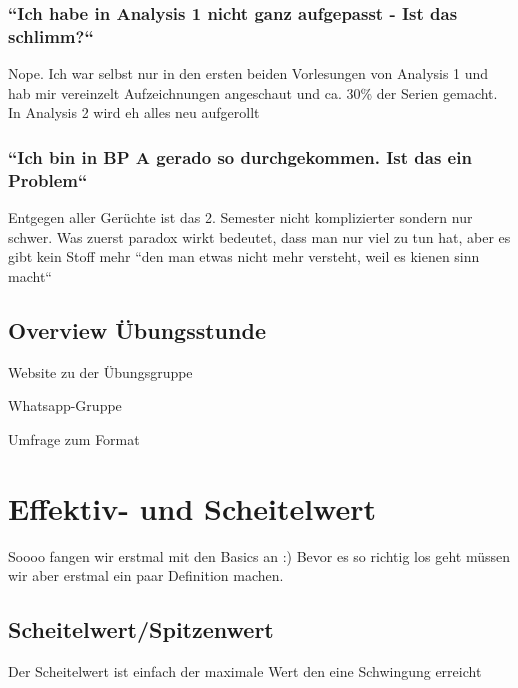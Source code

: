 \documentclass[11pt,a4paper]{article}
\begin{document}
\subsubsection{``Ich habe in Analysis 1 nicht ganz aufgepasst - Ist das schlimm{?}``}
Nope. Ich war selbst nur in den ersten beiden Vorlesungen von Analysis 1 und hab mir vereinzelt Aufzeichnungen angeschaut und ca. 30\% der Serien gemacht. In Analysis 2 wird eh alles neu aufgerollt

\subsubsection{``Ich bin in BP A gerado so durchgekommen. Ist das ein Problem``}
Entgegen aller Gerüchte ist das 2. Semester nicht komplizierter sondern nur schwer. Was zuerst paradox wirkt bedeutet, dass man nur viel zu tun hat, aber es gibt kein Stoff mehr ``den man etwas nicht mehr versteht, weil es kienen sinn macht``

\subsection{Overview Übungsstunde}
\centering

\begin{minipage}{0.8\linewidth}
    Website zu der Übungsgruppe
    \hfill  
\end{minipage}

\vfill %
\begin{minipage}{0.8\linewidth}  
    Whatsapp-Gruppe
    \hfill  
\end{minipage}
\vfill
\begin{minipage}{0.8\linewidth}
   
    Umfrage zum Format
    \hfill  
\end{minipage}
\newpage
\raggedright
\section{Effektiv- und Scheitelwert}
Soooo fangen wir erstmal mit den Basics an :) Bevor es so richtig los geht müssen wir aber erstmal ein paar Definition machen.

\subsection{Scheitelwert/Spitzenwert}
Der Scheitelwert ist einfach der maximale Wert den eine Schwingung erreicht
\end{document}
